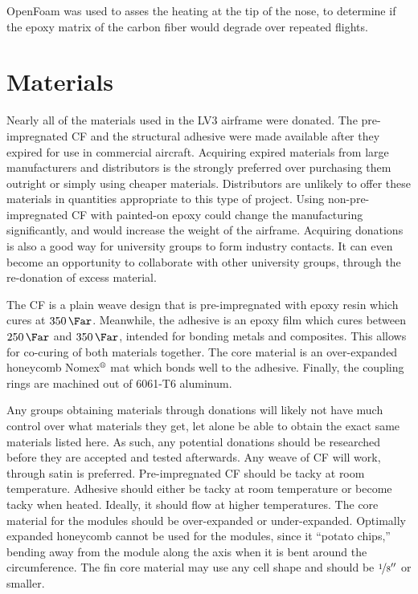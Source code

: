 \documentclass{aiaa-tc}%
\newcommand{\mathregistered}{\text{\textregistered}}
\begin{document}
OpenFoam was used to asses the heating at the tip of the nose, to determine if the epoxy matrix of the carbon fiber would degrade over repeated flights.


\section{Materials}

Nearly all of the materials used in the LV3 airframe were donated. The pre-impregnated CF and the structural adhesive were made available after they expired for use in commercial aircraft. 
Acquiring expired materials from large manufacturers and distributors is the strongly preferred over purchasing them outright or simply using cheaper materials. 
Distributors are unlikely to offer these materials in quantities appropriate to this type of project. 
Using non-pre-impregnated CF with painted-on epoxy could change the manufacturing significantly, and would increase the weight of the airframe. 
Acquiring donations is also a good way for university groups to form industry contacts. It can even become an opportunity to collaborate with other university groups, through the re-donation of excess material. 

The CF is a plain weave design that is pre-impregnated with epoxy resin which cures at $\SI{350}{\Far}$.
Meanwhile, the adhesive is an epoxy film which cures between $\SI{250}{\Far}$ and $\SI{350}{\Far}$, intended for bonding metals and composites. 
This allows for co-curing of both materials together. The core material is an over-expanded honeycomb Nomex$^\mathregistered$ mat which bonds well to the adhesive.
Finally, the coupling rings are machined out of 6061-T6 aluminum. 

Any groups obtaining materials through donations will likely not have much control over what materials they get, let alone be able to obtain the exact same materials listed here.
As such, any potential donations should be researched before they are accepted and tested afterwards. 
Any weave of CF will work, through satin is preferred. Pre-impregnated CF should be tacky at room temperature.
Adhesive should either be tacky at room temperature or become tacky when heated. Ideally, it should flow at higher temperatures. 
The core material for the modules should be over-expanded or under-expanded. 
Optimally expanded honeycomb cannot be used for the modules, since it ``potato chips,'' bending away from the module along the axis when it is bent around the circumference. 
The fin core material may use any cell shape and should be $\nicefrac{1}{8}''$ or smaller. 
\end{document}

